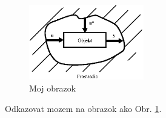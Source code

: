 \documentclass{book}
\begin{document}
\begin{figure}
  \centering
  \includegraphics[width=5cm]{OBRAZOK1_1}
  \caption{Moj obrazok}
  \label{odkaznaobrazok}
\end{figure}

Odkazovat mozem na obrazok ako Obr. \ref{odkaznaobrazok}.
\end{document}
